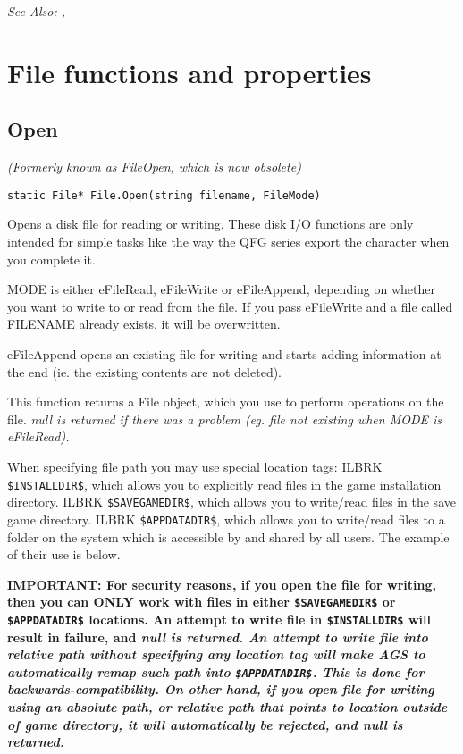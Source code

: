 \it{See Also:} ,



\section{File functions and properties}%


\subsection{Open}\label{File.Open}%

\it{(Formerly known as FileOpen, which is now obsolete)}

\begin{verbatim}
static File* File.Open(string filename, FileMode)
\end{verbatim}
Opens a disk file for reading or writing. These disk I/O functions are only
intended for simple tasks like the way the QFG series export the character
when you complete it.

MODE is either eFileRead, eFileWrite or eFileAppend, depending on
whether you want to write to or read from the file. If you pass eFileWrite
and a file called FILENAME already exists, it will be overwritten.

eFileAppend opens an existing file for writing and starts adding information at
the end (ie. the existing contents are not deleted).

This function returns a File object, which you use to perform operations on the
file. \it{null} is returned if there was a problem (eg. file not existing when MODE
is eFileRead).

When specifying file path you may use special location tags: ILBRK
\verb^$INSTALLDIR$^, which allows you to explicitly read files in the game installation directory. ILBRK
\verb^$SAVEGAMEDIR$^, which allows you to write/read files in the save game directory. ILBRK
\verb^$APPDATADIR$^, which allows you to write/read files to a folder on the system which
is accessible by and shared by all users.
The example of their use is below.

\bf{IMPORTANT}: For security reasons, if you open the file for writing, then you can ONLY work with
files in either \verb^$SAVEGAMEDIR$^ or \verb^$APPDATADIR$^ locations.
An attempt to write file in \verb^$INSTALLDIR$^ will result in failure, and \it{null} is returned.
An attempt to write file into relative path without specifying any location tag will make AGS to automatically
remap such path into \verb^$APPDATADIR$^. This is done for backwards-compatibility.
On other hand, if you open file for writing using an absolute path, or relative path that points to location outside of game directory, it will
automatically be rejected, and \it{null} is returned.

